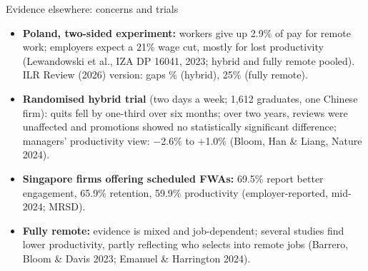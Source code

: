 \begin{frame}[t,label=B-intl]{Evidence elsewhere: concerns and trials}
  \FrameTop
  \begin{itemize}\setlength{\itemsep}{0.14cm}
    \item \textbf{Poland, two-sided experiment:} workers give up 2.9\% of pay for remote work; employers expect a 21\% wage cut, mostly for lost productivity (Lewandowski et al., IZA DP 16041, 2023; hybrid and fully remote pooled). ILR Review (2026) version: gaps \% (hybrid), 25\% (fully remote).
    \item \textbf{Randomised hybrid trial} (two days a week; 1,612 graduates, one Chinese firm): quits fell by one-third over six months; over two years, reviews were unaffected and promotions showed no statistically significant difference; managers' productivity view: $-$2.6\% to +1.0\% (Bloom, Han \& Liang, Nature 2024).
    \item \textbf{Singapore firms offering scheduled FWAs:} 69.5\% report better engagement, 65.9\% retention, 59.9\% productivity (employer-reported, mid-2024; MRSD).
    \item \textbf{Fully remote:} evidence is mixed and job-dependent; several studies find lower productivity, partly reflecting who selects into remote jobs (Barrero, Bloom \& Davis 2023; Emanuel \& Harrington 2024).
  \end{itemize}
\end{frame}

